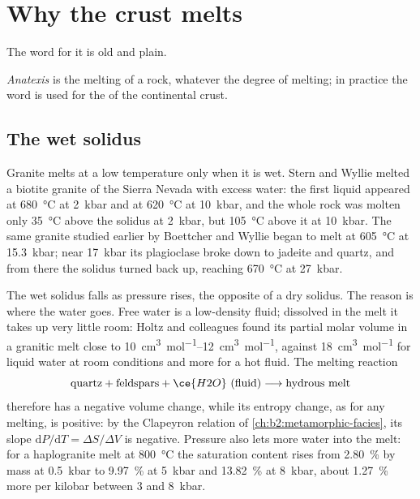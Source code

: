 \section{Why the crust melts}\label{sec:b2:crustal-melting:why}

The word for it is old and plain.

\begin{definition}[Anatexis]\label{def:b2:crustal-melting:anatexis}
\emph{Anatexis} is the melting of a rock, whatever the degree of melting;
in practice the word is used for the  of the continental crust.
\end{definition}

\subsection*{The wet solidus}

Granite melts at a low temperature only when it is wet. Stern and Wyllie melted a biotite
granite of the Sierra Nevada  with excess water: the first liquid appeared at
\qty{680}{\celsius} at \qty{2}{kbar} and at \qty{620}{\celsius} at \qty{10}{kbar}, and the
whole rock was molten only \qty{35}{\celsius} above the solidus at \qty{2}{kbar}, but
\qty{105}{\celsius} above it at \qty{10}{kbar}. The same granite studied earlier by
Boettcher and Wyllie began to melt at \qty{605}{\celsius} at \qty{15.3}{kbar}; near
\qty{17}{kbar} its plagioclase broke down to jadeite and quartz, and from there the solidus
turned back up, reaching \qty{670}{\celsius} at \qty{27}{kbar}.

The wet solidus falls as pressure rises, the opposite of a dry solidus. The reason is where
the water goes. Free water is a low-density fluid; dissolved in the melt it takes up very
little room: Holtz and colleagues found its partial molar volume in a granitic melt close
to \qtyrange{10}{12}{\cubic\centi\metre\per\mole}, against \qty{18}{\cubic\centi\metre\per\mole}
for liquid water at room conditions and more for a hot fluid. The melting reaction
\[\text{quartz} + \text{feldspars} + \ce{H2O}\ (\text{fluid}) \longrightarrow
\text{hydrous melt}\]
therefore has a negative volume change, while its entropy change, as for any melting, is
positive: by the Clapeyron relation of \cref{ch:b2:metamorphic-facies}, its slope
$\mathrm{d}P/\mathrm{d}T = \Delta S/\Delta V$ is negative. Pressure also lets more water
into the melt: for a haplogranite melt at \qty{800}{\celsius} the saturation content rises
from \qty{2.80}{\percent} by mass at \qty{0.5}{kbar} to \qty{9.97}{\percent} at
\qty{5}{kbar} and \qty{13.82}{\percent} at \qty{8}{kbar}, about \qty{1.27}{\percent} more
per kilobar between 3 and \qty{8}{kbar}.

